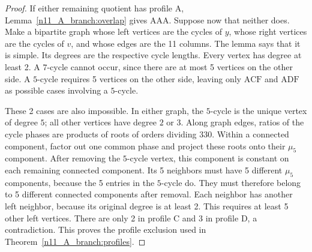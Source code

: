 \documentclass[11pt,a4paper]{article}
\theoremstyle{plain}
\theoremstyle{definition}
\theoremstyle{plain}
\begin{document}
\begin{proof}
If either remaining quotient has profile $\mathrm{A}$, Lemma~\ref{n11_A_branch:overlap} gives $\mathrm{AAA}$. Suppose now that neither does. Make a bipartite graph whose left vertices are the cycles of $y$, whose right vertices are the cycles of $v$, and whose edges are the 11 columns. The lemma says that it is simple. Its degrees are the respective cycle lengths. Every vertex has degree at least 2. A $7$-cycle cannot occur, since there are at most 5 vertices on the other side. A $5$-cycle requires 5 vertices on the other side, leaving only $\mathrm{ACF}$ and $\mathrm{ADF}$ as possible cases involving a $5$-cycle.

These 2 cases are also impossible. In either graph, the $5$-cycle is the unique vertex of degree $5$; all other vertices have degree $2$ or $3$. Along graph edges, ratios of the cycle phases are products of roots of orders dividing $330$. Within a connected component, factor out one common phase and project these roots onto their $\mu_5$ component. After removing the $5$-cycle vertex, this component is constant on each remaining connected component. Its 5 neighbors must have 5 different $\mu_5$ components, because the 5 entries in the $5$-cycle do. They must therefore belong to 5 different connected components after removal. Each neighbor has another left neighbor, because its original degree is at least 2. This requires at least 5 other left vertices. There are only 2 in profile $\mathrm{C}$ and 3 in profile $\mathrm{D}$, a contradiction. This proves the profile exclusion used in Theorem~\ref{n11_A_branch:profiles}.


\end{proof}
\end{document}
